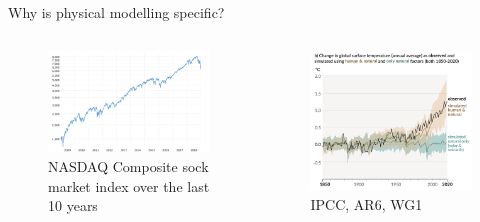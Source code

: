 \documentclass[handout, 10pt]{beamer}
\begin{document}
\begin{frame}{Why is physical modelling specific?}

\begin{columns}


\begin{figure}
    \caption*{NASDAQ Composite sock market index over the last 10 years}
    \includegraphics[width=\textwidth]{fig/L1/nasdaq-composite-index-10-year-daily-chart-2019-01-09-macrotrends.png}
\end{figure}

\begin{figure}
\caption{IPCC, AR6, WG1}

    \includegraphics[width=\textwidth]{fig/IPPC_temp.png}
\end{figure}

\end{columns}
    
\end{frame}
\end{document}
